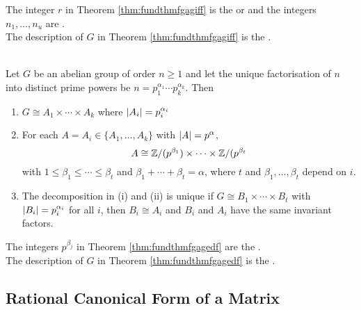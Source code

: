 \begin{definition}
The integer $r$ in Theorem \ref{thm:fundthmfgagiff} is the  or  and the integers $n_1, \ldots, n_u$ are .\\
The description of $G$ in Theorem \ref{thm:fundthmfgagiff} is the .
\end{definition}

\begin{theorem}
\label{thm:fundthmfgagedf}
\\
Let $G$ be an abelian group of order $n \geq 1$ and let the unique factorisation of $n$ into distinct prime powers be $n=p_1^{\alpha_1} \cdots p_k^{\alpha_k}$. Then
\begin{enumerate}[label=(\roman*)]
\item $G \cong A_1 \times \cdots \times A_k$ where $\left\lvert A_i\right\rvert = p_i^{\alpha_i}$
\item For each $A = A_i \in \{A_1, \ldots, A_k \}$ with $\left\lvert A\right\rvert = p^{\alpha}$,
\begin{equation}
A \cong \mathbb{Z}/(p^{\beta_1}) \times \cdots \times \mathbb{Z}/(p^{\beta_t} \nonumber
\end{equation}
with $1 \leq \beta_1 \leq \cdots \leq \beta_t$ and $\beta_1 + \cdots + \beta_t = \alpha$, where $t$ and $\beta_1, \ldots, \beta_t$ depend on $i$.
\item The decomposition in (i) and (ii) is unique if $G \cong B_1 \times \cdots \times B_t$ with $\left\lvert B_i\right\rvert = p_i^{\alpha_i}$ for all $i$, then $B_i \cong A_i$ and $B_i$ and $A_i$ have the same invariant factors.
\end{enumerate}
\end{theorem}

\begin{definition}
The integers $p^{\beta_j}$ in Theorem \ref{thm:fundthmfgagedf} are the .\\
The description of $G$ in Theorem \ref{thm:fundthmfgagedf} is the .
\end{definition}

\subsection{Rational Canonical Form of a Matrix}

